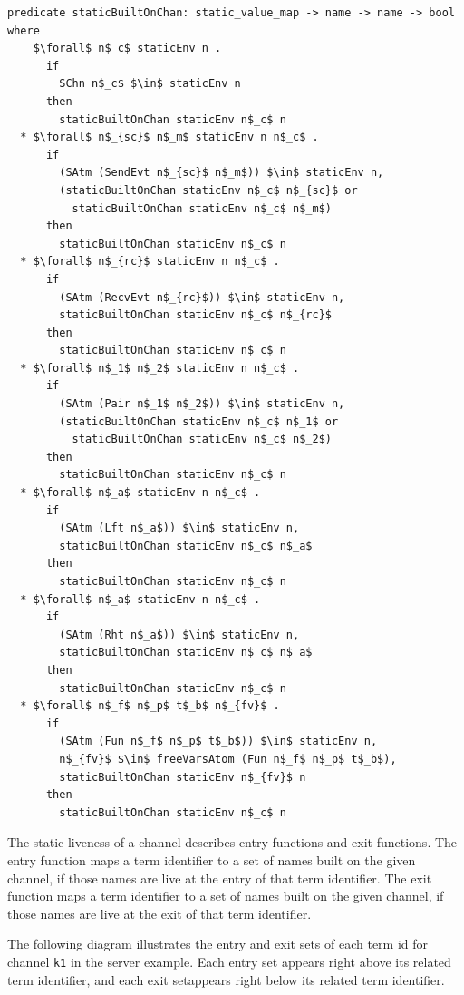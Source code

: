 \documentclass[letterpaper, 11pt]{extarticle}
\begin{document}
\begin{lstlisting}[language=logic, mathescape]
  predicate staticBuiltOnChan: static_value_map -> name -> name -> bool where
    $\forall$ n$_c$ staticEnv n .
      if 
        SChn n$_c$ $\in$ staticEnv n 
      then 
        staticBuiltOnChan staticEnv n$_c$ n
  * $\forall$ n$_{sc}$ n$_m$ staticEnv n n$_c$ . 
      if
        (SAtm (SendEvt n$_{sc}$ n$_m$)) $\in$ staticEnv n,
        (staticBuiltOnChan staticEnv n$_c$ n$_{sc}$ or
          staticBuiltOnChan staticEnv n$_c$ n$_m$)
      then 
        staticBuiltOnChan staticEnv n$_c$ n
  * $\forall$ n$_{rc}$ staticEnv n n$_c$ . 
      if  
        (SAtm (RecvEvt n$_{rc}$)) $\in$ staticEnv n,
        staticBuiltOnChan staticEnv n$_c$ n$_{rc}$
      then 
        staticBuiltOnChan staticEnv n$_c$ n
  * $\forall$ n$_1$ n$_2$ staticEnv n n$_c$ . 
      if  
        (SAtm (Pair n$_1$ n$_2$)) $\in$ staticEnv n,
        (staticBuiltOnChan staticEnv n$_c$ n$_1$ or
          staticBuiltOnChan staticEnv n$_c$ n$_2$)
      then 
        staticBuiltOnChan staticEnv n$_c$ n
  * $\forall$ n$_a$ staticEnv n n$_c$ .
      if
        (SAtm (Lft n$_a$)) $\in$ staticEnv n,
        staticBuiltOnChan staticEnv n$_c$ n$_a$
      then 
        staticBuiltOnChan staticEnv n$_c$ n
  * $\forall$ n$_a$ staticEnv n n$_c$ .
      if
        (SAtm (Rht n$_a$)) $\in$ staticEnv n,
        staticBuiltOnChan staticEnv n$_c$ n$_a$
      then 
        staticBuiltOnChan staticEnv n$_c$ n
  * $\forall$ n$_f$ n$_p$ t$_b$ n$_{fv}$ .
      if
        (SAtm (Fun n$_f$ n$_p$ t$_b$)) $\in$ staticEnv n,
        n$_{fv}$ $\in$ freeVarsAtom (Fun n$_f$ n$_p$ t$_b$),
        staticBuiltOnChan staticEnv n$_{fv}$ n
      then
        staticBuiltOnChan staticEnv n$_c$ n
\end{lstlisting}


The static liveness of a channel describes entry functions and exit functions.
The entry function maps a term identifier to a set of names built on
the given channel, if those names are live at the entry of that term identifier.
The exit function maps a term identifier to a
set of names built on the given channel, if those names are live at the exit of that
term identifier.

The following diagram illustrates the entry and exit sets of each term id
for channel \lstinline{k1} in
the server example.  Each entry set appears right above its related term identifier,
and each exit setappears right below its related term identifier. 
\end{document}
